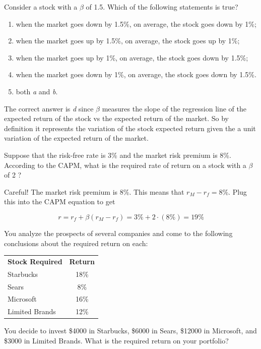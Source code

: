 \begin{question}
Consider a stock with a $\beta$ of 1.5. Which of the following statements is true?

\begin{enumerate}[label=\emph{\alph*}]
\tightlist
\item when the market goes down by 1.5\%, on average, the stock goes down by 1\%;
\item when the market goes up by 1.5\%, on average, the stock goes up by 1\%;
\item when the market goes up by 1\%, on average, the stock goes down by 1.5\%;
\item when the market goes down by 1\%, on average, the stock goes down by 1.5\%. 
\item both \emph{a} and \emph{b}.	
\end{enumerate}
\end{question}

\begin{solution}
The correct answer is \emph{d} since $\beta$ measures the slope of the regression line of the expected return of the stock vs the expected return of the market. So by definition it represents the variation of the stock expected return given the a unit variation of the expected return of the market.
\end{solution}	

\begin{question}
Suppose that the risk-free rate is 3\% and the market risk premium is 8\%. According to the CAPM, what is the required rate of return on a stock with a $\beta$ of 2 ?
\end{question}

\begin{solution}
Careful! The market risk premium is 8\%. This means that $r_M - r_f  = 8\%$. Plug this into the CAPM equation to get

\begin{equation*}
r = r_f + \beta(r_M - r_f) = 3\% + 2\cdot(8\%) =19\%
\end{equation*}
\end{solution}

\begin{question}
You analyze the prospects of several companies and come to the following conclusions about the required return on each:

\begin{center}
\begin{tabular}{lc}
\textbf{Stock Required} & \textbf{Return} \\
Starbucks &18\% \\
Sears &8\% \\
Microsoft &16\% \\
Limited Brands &12\% \\
\end{tabular}
\end{center}

You decide to invest \$4000 in Starbucks, \$6000 in Sears, \$12000 in Microsoft, and \$3000 in Limited Brands. What is the required return on your portfolio?
\end{question}

